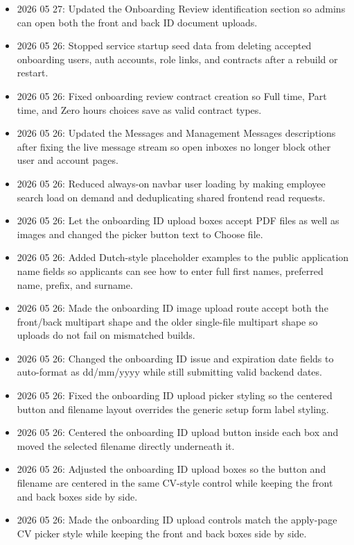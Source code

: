 \documentclass[11pt]{article}
\begin{document}
\begin{itemize}
    \item 2026 05 27: Updated the Onboarding Review identification section so admins can open both the front and back ID document uploads.
    \item 2026 05 26: Stopped service startup seed data from deleting accepted onboarding users, auth accounts, role links, and contracts after a rebuild or restart.
    \item 2026 05 26: Fixed onboarding review contract creation so Full time, Part time, and Zero hours choices save as valid contract types.
    \item 2026 05 26: Updated the Messages and Management Messages descriptions after fixing the live message stream so open inboxes no longer block other user and account pages.
    \item 2026 05 26: Reduced always-on navbar user loading by making employee search load on demand and deduplicating shared frontend read requests.
    \item 2026 05 26: Let the onboarding ID upload boxes accept PDF files as well as images and changed the picker button text to Choose file.
    \item 2026 05 26: Added Dutch-style placeholder examples to the public application name fields so applicants can see how to enter full first names, preferred name, prefix, and surname.
    \item 2026 05 26: Made the onboarding ID image upload route accept both the front/back multipart shape and the older single-file multipart shape so uploads do not fail on mismatched builds.
    \item 2026 05 26: Changed the onboarding ID issue and expiration date fields to auto-format as dd/mm/yyyy while still submitting valid backend dates.
    \item 2026 05 26: Fixed the onboarding ID upload picker styling so the centered button and filename layout overrides the generic setup form label styling.
    \item 2026 05 26: Centered the onboarding ID upload button inside each box and moved the selected filename directly underneath it.
    \item 2026 05 26: Adjusted the onboarding ID upload boxes so the button and filename are centered in the same CV-style control while keeping the front and back boxes side by side.
    \item 2026 05 26: Made the onboarding ID upload controls match the apply-page CV picker style while keeping the front and back boxes side by side.

\end{itemize}
\end{document}
